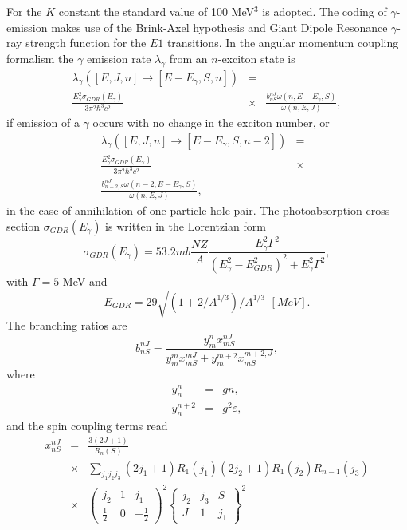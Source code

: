 \documentclass[twocolumn,amsmath,amssymb,10pt,groupedaddress,letter]{revtex4}
\begin{document}
For the $K$ constant the standard value of 100 MeV$^{3}$ is adopted.
The coding of $\gamma$-emission makes use of the Brink-Axel hypothesis
\cite{Axel,Brink,Brinka} and Giant Dipole Resonance $\gamma$-ray
strength function for the $E1$ transitions. In the angular momentum
coupling formalism the $\gamma$ emission rate $\lambda_{\gamma}$
from an $n$-exciton state is
\begin{eqnarray}
\lambda_{\gamma}\left(\left[E,J,n\right]\rightarrow\left[E-E_{\gamma},S,n\right]\right)&=&\\
\frac{E_{\gamma}^{2}\sigma_{GDR}(E_{\gamma})}{3\pi^{2}\hbar^{3}c^{2}}&\times&\frac{b_{nS}^{nJ}\omega(n,E-E_{\gamma},S)}{\omega(n,E,J)}
\nonumber,
\end{eqnarray}
 if emission of a $\gamma$ occurs with no change in the exciton number,
or
\begin{eqnarray}
\lambda_{\gamma}\left(\left[E,J,n\right]\rightarrow\left[E-E_{\gamma},S,n-2\right]\right)&=&\nonumber\\
\frac{E_{\gamma}^{2}\sigma_{GDR}(E_{\gamma})}{3\pi^{2}\hbar^{3}c^{2}}&\times&\nonumber\\
\frac{b_{n-2,S}^{nJ}\omega(n-2,E-E_{\gamma},S)}{\omega(n,E,J)},&&
\end{eqnarray}
 in the case of annihilation of one particle-hole pair. The photoabsorption
cross section $\sigma_{GDR}(E_{\gamma})$ is written in the Lorentzian
form
\begin{equation}
\sigma_{GDR}(E_{\gamma})=53.2mb\frac{NZ}{A}\frac{E_{\gamma}^{2}\Gamma^{2}}{\left(E_{\gamma}^{2}-E_{GDR}^{2}\right)^{2}+E_{\gamma}^{2}\Gamma^{2}},
\end{equation}
with $\Gamma=5$ MeV and
\begin{equation}
E_{GDR}=29\sqrt{\left(1+2/A^{1/3}\right)/A^{1/3}}\,\,[MeV].
\end{equation}
 The branching ratios are
\begin{equation}
b_{nS}^{nJ}=\frac{y_{m}^{n}x_{mS}^{nJ}}{y_{m}^{m}x_{mS}^{mJ}+y_{m}^{m+2}x_{mS}^{m+2,J}},
\end{equation}
\noindent where
\begin{eqnarray}
y_{n}^{n} & = & gn,\nonumber \\
y_{n}^{n+2} & = & g^{2}\varepsilon,
\end{eqnarray}
and the spin coupling terms read
\begin{eqnarray}
x_{nS}^{nJ} & = & \frac{3(2J+1)}{R_{n}(S)}\nonumber\\
& \times &\sum_{j_{1}j_{2}j_{3}}(2j_{1}+1)R_{1}(j_{1})(2j_{2}+1)R_{1}(j_{2})R_{n-1}(j_{3})\nonumber \\
 & \times & \left(\begin{array}{ccc}
j_{2} & 1 & j_{1}\\
\frac{1}{2} & 0 & -\frac{1}{2}\end{array}\right)^{2}\left\{ \begin{array}{ccc}
j_{2} & j_{3} & S\\
J & 1 & j_{1}\end{array}\right\} ^{2}
\end{eqnarray}
\end{document}
